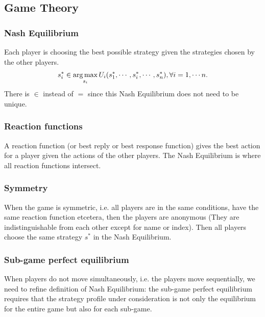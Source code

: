 \subsection{Game Theory}
\subsubsection{Nash Equilibrium}
Each player is choosing the best possible strategy given the strategies chosen by the other players.
\begin{align}
	s^*_i\in \underset{s_i}{\operatorname*{arg\,max}}\,U_i(s^*_1,\cdots,s^*_i,\cdots,s_n^*),\forall i=1,\cdots n.
\end{align}
There is $\in$ instead of $=$ since this Nash Equilibrium does not need to be unique.
\subsubsection{Reaction functions}
A reaction function (or best reply or best response function) gives the best action for a player
given the actions of the other players. The Nash Equilibrium is where all reaction functions intersect.
\subsubsection{Symmetry}
When the game is symmetric, i.e. all players are in the same conditions, have the same reaction function
etcetera, then the players are anonymous (They are indistinguishable from each other except for
name or index). Then all players choose the same strategy $s^*$ in the Nash Equilibrium.
\subsubsection{Sub-game perfect equilibrium}
When players do not move simultaneously, i.e. the players move sequentially, we need to refine
definition of Nash Equilibrium: the sub-game perfect equilibrium requires that the strategy profile
under consideration is not only the equilibrium for the entire game but also for each sub-game.
